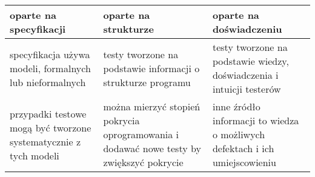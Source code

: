 \documentclass[../main.tex]{subfiles}
\begin{document}
    \begin{table}[H]
        \begin{center}
            \begin{tabular}{ p{5cm} p{5cm} p{5cm} }
                \toprule
                \textbf{oparte na specyfikacji} & \textbf{oparte na strukturze} & \textbf{oparte na doświadczeniu}\\
                \toprule
                specyfikacja używa
                modeli, formalnych
                lub nieformalnych
                &
                testy tworzone na
                podstawie informacji
                o strukturze programu
                &
                testy tworzone na
                podstawie wiedzy,
                doświadczenia i
                intuicji testerów\\

                przypadki testowe
                mogą być tworzone
                systematycznie z
                tych modeli
                &
                można mierzyć
                stopień pokrycia
                oprogramowania i
                dodawać nowe testy
                by zwiększyć pokrycie
                &
                inne źródło informacji
                to wiedza o
                możliwych defektach i
                ich umiejscowieniu\\


\end{tabular}
\end{center}
\end{table}
\end{document}
